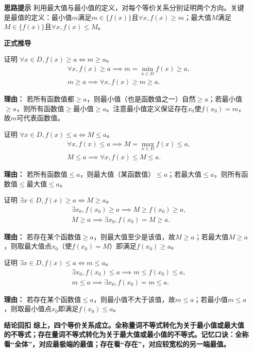 \begin{proofbox}
	\textbf{\textcolor{CProof}{思路提示}}
	利用最大值与最小值的定义，对每个等价关系分别证明两个方向。关键是最值的定义：最小值$m$满足$m\in\{f(x)\}$且$\forall x, f(x)\ge m$；最大值$M$满足$M\in\{f(x)\}$且$\forall x, f(x)\le M$。

	\medskip
	\textbf{\textcolor{CProof}{正式推导}}
	\begin{description}[style=nextline, leftmargin=2.8em, labelsep=0.5em, itemsep=0.55em]
		\item[\textbf{步骤一（全称大于等价）：}]
			证明 $\forall x\in D, f(x)\geq a \iff m\geq a$。
			\[
				\begin{aligned}
					&\forall x, f(x)\geq a \implies m = \min_{x\in D} f(x) \geq a,\\&m\geq a \implies \forall x, f(x)\geq m\geq a.
			\end{aligned}
			\]
			\par\textbf{理由：} 若所有函数值都$\ge a$，则最小值（也是函数值之一）自然$\ge a$；若最小值$\ge a$，则所有函数值$\ge$最小值$\ge a$。注意最小值定义保证存在$x_0$使$f(x_0)=m$，故$m$可代表函数值。
		\item[\textbf{步骤二（全称小于等价）：}]
			证明 $\forall x\in D, f(x)\leq a \iff M\leq a$。
			\[
				\begin{aligned}
					&\forall x, f(x)\leq a \implies M = \max_{x\in D} f(x) \leq a,\\&M\leq a \implies \forall x, f(x)\leq M\leq a.
			\end{aligned}
			\]
			\par\textbf{理由：} 若所有函数值$\le a$，则最大值（某函数值）$\le a$；若最大值$\le a$，则所有函数值$\le$最大值$\le a$。
		\item[\textbf{步骤三（存在大于等价）：}]
			证明 $\exists x\in D, f(x)\geq a \iff M\geq a$。
			\[
				\begin{aligned}
					&\exists x_0, f(x_0)\geq a \implies M \geq f(x_0)\geq a,\\&M\geq a \implies \exists x_0, f(x_0)=M\geq a.
			\end{aligned}
			\]
			\par\textbf{理由：} 若存在某个函数值$\ge a$，则最大值至少是该值，故$M\geq a$；若最大值$M\geq a$，则取最大值点$x_0$（使$f(x_0)=M$）即满足$f(x_0)\geq a$。
		\item[\textbf{步骤四（存在小于等价）：}]
			证明 $\exists x\in D, f(x)\leq a \iff m\leq a$。
			\[
				\begin{aligned}
					&\exists x_0, f(x_0)\leq a \implies m \leq f(x_0)\leq a,\\&m\leq a \implies \exists x_0, f(x_0)=m\leq a.
			\end{aligned}
			\]
			\par\textbf{理由：} 若存在某个函数值$\le a$，则最小值不大于该值，故$m\leq a$；若最小值$m\leq a$，则取最小值点$x_0$即满足$f(x_0)\leq a$。
	\end{description}

	\medskip
	\textbf{\textcolor{CProof}{结论回扣}}
	\textbf{综上，四个等价关系成立。全称量词不等式转化为关于最小值或最大值的不等式；存在量词不等式转化为关于最大值或最小值的不等式。记忆口诀：全称看“全体”，对应最极端的最值；存在看“存在”，对应较宽松的另一端最值。}
\end{proofbox}
